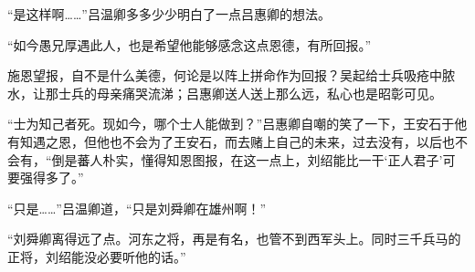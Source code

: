 “是这样啊……”吕温卿多多少少明白了一点吕惠卿的想法。

“如今愚兄厚遇此人，也是希望他能够感念这点恩德，有所回报。”

施恩望报，自不是什么美德，何论是以阵上拼命作为回报？吴起给士兵吸疮中脓水，让那士兵的母亲痛哭流涕；吕惠卿送人送上那么远，私心也是昭彰可见。

“士为知己者死。现如今，哪个士人能做到？”吕惠卿自嘲的笑了一下，王安石于他有知遇之恩，但他也不会为了王安石，而去赌上自己的未来，过去没有，以后也不会有，“倒是蕃人朴实，懂得知恩图报，在这一点上，刘绍能比一干‘正人君子’可要强得多了。”

“只是……”吕温卿道，“只是刘舜卿在雄州啊！”

“刘舜卿离得远了点。河东之将，再是有名，也管不到西军头上。同时三千兵马的正将，刘绍能没必要听他的话。”
